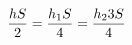 \documentclass[preview]{standalone}
\begin{document}
\begin{align*}
\special{dvisvgm:raw <g id='unique000'>}\frac{hS}{2} =\frac{h_1 S}{4} =\frac{h_2 3S}{4}\special{dvisvgm:raw </g>}
\end{align*}
\end{document}
